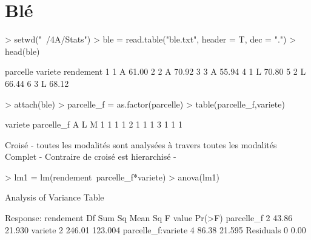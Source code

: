 \documentclass{article}
\begin{document}


\section{Blé}
\begin{Schunk}
\begin{Sinput}
> setwd("~/4A/Stats")
> ble = read.table("ble.txt", header = T, dec = ".")
> head(ble)
\end{Sinput}
\begin{Soutput}
  parcelle variete rendement
1        1       A     61.00
2        2       A     70.92
3        3       A     55.94
4        1       L     70.80
5        2       L     66.44
6        3       L     68.12
\end{Soutput}
\begin{Sinput}
> attach(ble)
> parcelle_f = as.factor(parcelle)
> table(parcelle_f,variete)
\end{Sinput}
\begin{Soutput}
          variete
parcelle_f A L M
         1 1 1 1
         2 1 1 1
         3 1 1 1
\end{Soutput}
\end{Schunk}
Croisé - toutes les modalités sont analysées à travers toutes les modalités
Complet - 
Contraire de croisé est hierarchisé - 

\begin{Schunk}
\begin{Sinput}
> lm1 = lm(rendement~parcelle_f*variete)
> anova(lm1)
\end{Sinput}
\begin{Soutput}
Analysis of Variance Table

Response: rendement
                   Df Sum Sq Mean Sq F value Pr(>F)
parcelle_f          2  43.86  21.930               
variete             2 246.01 123.004               
parcelle_f:variete  4  86.38  21.595               
Residuals           0   0.00                       
\end{Soutput}
\end{Schunk}
\end{document}
